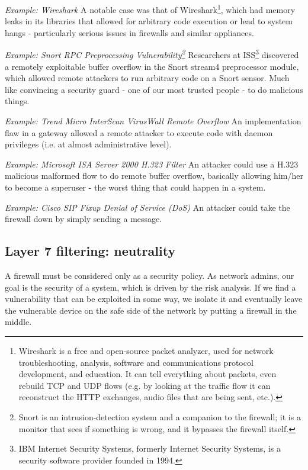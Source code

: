 \emph{Example: Wireshark} A notable case was that of Wireshark\footnote{Wireshark is a free and open-source packet analyzer, used for network troubleshooting, analysis, software and communications protocol development, and education. It can tell everything about packets, even rebuild TCP and UDP flows (e.g. by looking at the traffic flow it can reconstruct the HTTP exchanges, audio files that are being sent, etc.).}, which had memory leaks in its libraries that allowed for arbitrary code execution or lead to system hangs - particularly serious issues in firewalls and similar appliances.

\vspace{0.5em}

\emph{Example: Snort RPC Preprocessing Vulnerability\footnote{Snort is an intrusion-detection system and a companion to the firewall; it is a monitor that sees if something is wrong, and it bypasses the firewall itself.}} Researchers at ISS\footnote{IBM Internet Security Systems, formerly Internet Security Systems, is a security software provider founded in 1994.} discovered a remotely exploitable buffer overflow
in the Snort stream4 preprocessor module, which allowed remote attackers to run arbitrary code on a Snort
sensor. Much like convincing a security guard -  one of our most trusted people - to do malicious things.

\vspace{0.5em}

\emph{Example: Trend Micro InterScan VirusWall Remote Overflow} An implementation flaw in a gateway allowed a remote attacker to execute code with daemon privileges (i.e. at almost administrative level).

\vspace{0.5em}

\emph{Example: Microsoft ISA Server 2000 H.323 Filter} An attacker could use a H.323 malicious malformed flow to do remote buffer overflow, basically allowing him/her to become a superuser - the worst thing that could happen in a system.

\vspace{0.5em}

\emph{Example: Cisco SIP Fixup Denial of Service (DoS)} An attacker could take the firewall down by simply sending a message.

\vspace{0.5em}


\subsection{Layer 7 filtering: neutrality}
A firewall must be considered only as a security policy. As network admins, our goal is the security of a system, which is driven by the risk analysis. If we find a vulnerability that can be exploited in some way, we isolate it and eventually leave the vulnerable device on the safe side of the network by putting a firewall in the middle.

